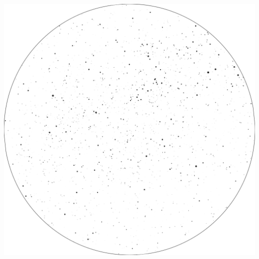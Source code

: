\documentclass{./SAS-class-skygen}
\begin{document}
	\vspace{0.5cm}
    \begin{center}
    \includegraphics[width=\textwidth]{./pics/skychart54.png}
    \end{center}
    
    
\end{document}
